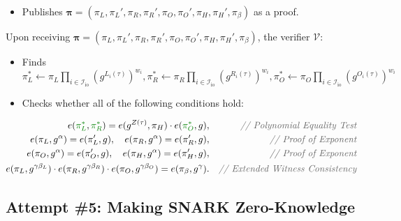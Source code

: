 \documentclass[../lecture-notes.tex]{subfiles}
\begin{document}
\begin{tcolorbox}
\begin{itemize}[label=]
\begin{align*}
            \pi_O \gets g^{\textcolor{green!50!black}{O_{\text{mid}}(\tau)}}, \quad \pi_O' \gets g^{\alpha \textcolor{green!50!black}{O_{\text{mid}}(\tau)}}, \\
            \pi_H \gets g^{H(\tau)}, \quad \pi_H' \gets g^{\alpha H(\tau)}, \\
            \pi_{\beta} \gets g^{\beta_LL(\tau) + \beta_RR(\tau) + \beta_OO(\tau)}.
        \end{align*}
        \item Publishes $\boldsymbol{\pi} = (\pi_L,\pi_L',\pi_R,\pi_R',\pi_O,\pi_O',\pi_H,\pi_H',\pi_{\beta})$ as a proof.
    \end{itemize}

    Upon receiving $\boldsymbol{\pi} = (\pi_L,\pi_L',\pi_R,\pi_R',\pi_O,\pi_O',\pi_H,\pi_H',\pi_{\beta})$, the verifier $\mathcal{V}$:
    \begin{itemize}[label=]
        \item \textcolor{green!50!black}{Finds $\pi_L^* \gets \pi_L\prod_{i \in \mathcal{I}_{\text{io}}} (g^{L_i(\tau)})^{w_i},\pi_R^* \gets \pi_R\prod_{i \in \mathcal{I}_{\text{io}}} (g^{R_i(\tau)})^{w_i},\pi_O^* \gets \pi_O\prod_{i \in \mathcal{I}_{\text{io}}} (g^{O_i(\tau)})^{w_i}$}
        \item Checks whether all of the following conditions hold:
    \end{itemize}
    \begin{align*}
        e(\textcolor{green!50!black}{\pi_L^*}, \textcolor{green!50!black}{\pi_R^*}) = e(g^{Z(\tau)}, \pi_H) \cdot e(\textcolor{green!50!black}{\pi_O^*}, g),&&\textcolor{gray!80!black}{\textit{// Polynomial Equality Test}} \\
        e(\pi_L, g^{\alpha}) = e(\pi_L', g), \quad e(\pi_R, g^{\alpha}) = e(\pi_R', g),&&\textcolor{gray!80!black}{\textit{// Proof of Exponent}} \\
        e(\pi_O, g^{\alpha}) = e(\pi_O', g), \quad e(\pi_H, g^{\alpha}) = e(\pi_H', g),&&\textcolor{gray!80!black}{\textit{// Proof of Exponent}} \\
        e(\pi_L, g^{\gamma\beta_L}) \cdot e(\pi_R, g^{\gamma\beta_R}) \cdot e(\pi_O, g^{\gamma\beta_O}) = e(\pi_{\beta}, g^{\gamma}).&&\textcolor{gray!80!black}{\textit{// Extended Witness Consistency}}
    \end{align*}
\end{tcolorbox}

\subsection{Attempt \#5: Making SNARK Zero-Knowledge}
\end{document}
